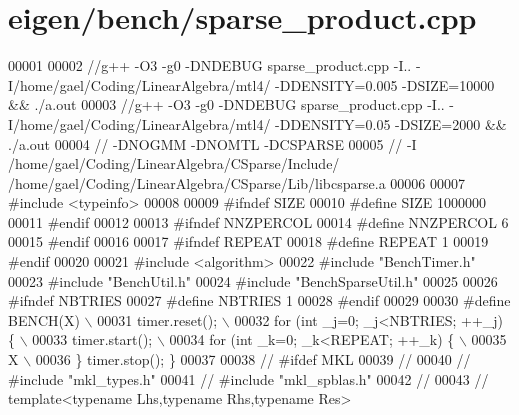 \hypertarget{eigen_2bench_2sparse__product_8cpp_source}{}\section{eigen/bench/sparse\+\_\+product.cpp}
\label{eigen_2bench_2sparse__product_8cpp_source}

\begin{DoxyCode}
00001 
00002 \textcolor{comment}{//g++ -O3 -g0 -DNDEBUG  sparse\_product.cpp -I.. -I/home/gael/Coding/LinearAlgebra/mtl4/ -DDENSITY=0.005
       -DSIZE=10000 && ./a.out}
00003 \textcolor{comment}{//g++ -O3 -g0 -DNDEBUG  sparse\_product.cpp -I.. -I/home/gael/Coding/LinearAlgebra/mtl4/ -DDENSITY=0.05
       -DSIZE=2000 && ./a.out}
00004 \textcolor{comment}{// -DNOGMM -DNOMTL -DCSPARSE}
00005 \textcolor{comment}{// -I /home/gael/Coding/LinearAlgebra/CSparse/Include/
       /home/gael/Coding/LinearAlgebra/CSparse/Lib/libcsparse.a}
00006 
00007 \textcolor{preprocessor}{#include <typeinfo>}
00008 
00009 \textcolor{preprocessor}{#ifndef SIZE}
00010 \textcolor{preprocessor}{#define SIZE 1000000}
00011 \textcolor{preprocessor}{#endif}
00012 
00013 \textcolor{preprocessor}{#ifndef NNZPERCOL}
00014 \textcolor{preprocessor}{#define NNZPERCOL 6}
00015 \textcolor{preprocessor}{#endif}
00016 
00017 \textcolor{preprocessor}{#ifndef REPEAT}
00018 \textcolor{preprocessor}{#define REPEAT 1}
00019 \textcolor{preprocessor}{#endif}
00020 
00021 \textcolor{preprocessor}{#include <algorithm>}
00022 \textcolor{preprocessor}{#include "BenchTimer.h"}
00023 \textcolor{preprocessor}{#include "BenchUtil.h"}
00024 \textcolor{preprocessor}{#include "BenchSparseUtil.h"}
00025 
00026 \textcolor{preprocessor}{#ifndef NBTRIES}
00027 \textcolor{preprocessor}{#define NBTRIES 1}
00028 \textcolor{preprocessor}{#endif}
00029 
00030 \textcolor{preprocessor}{#define BENCH(X) \(\backslash\)}
00031 \textcolor{preprocessor}{  timer.reset(); \(\backslash\)}
00032 \textcolor{preprocessor}{  for (int \_j=0; \_j<NBTRIES; ++\_j) \{ \(\backslash\)}
00033 \textcolor{preprocessor}{    timer.start(); \(\backslash\)}
00034 \textcolor{preprocessor}{    for (int \_k=0; \_k<REPEAT; ++\_k) \{ \(\backslash\)}
00035 \textcolor{preprocessor}{        X  \(\backslash\)}
00036 \textcolor{preprocessor}{  \} timer.stop(); \}}
00037 
00038 \textcolor{comment}{// #ifdef MKL}
00039 \textcolor{comment}{//}
00040 \textcolor{comment}{// #include "mkl\_types.h"}
00041 \textcolor{comment}{// #include "mkl\_spblas.h"}
00042 \textcolor{comment}{//}
00043 \textcolor{comment}{// template<typename Lhs,typename Rhs,typename Res>}

\end{DoxyCode}
